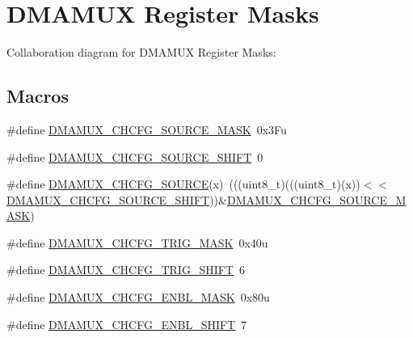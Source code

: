 \hypertarget{group___d_m_a_m_u_x___register___masks}{}\section{D\+M\+A\+M\+UX Register Masks}
\label{group___d_m_a_m_u_x___register___masks}
Collaboration diagram for D\+M\+A\+M\+UX Register Masks\+:
\subsection*{Macros}
\begin{DoxyCompactItemize}
\item 
\#define \hyperlink{group___d_m_a_m_u_x___register___masks_ga35b279ba0b1c9e817901494cdac305c5}{D\+M\+A\+M\+U\+X\+\_\+\+C\+H\+C\+F\+G\+\_\+\+S\+O\+U\+R\+C\+E\+\_\+\+M\+A\+SK}~0x3\+Fu
\item 
\#define \hyperlink{group___d_m_a_m_u_x___register___masks_gac2b7553c4599d8e919750598dd03f8a3}{D\+M\+A\+M\+U\+X\+\_\+\+C\+H\+C\+F\+G\+\_\+\+S\+O\+U\+R\+C\+E\+\_\+\+S\+H\+I\+FT}~0
\item 
\#define \hyperlink{group___d_m_a_m_u_x___register___masks_ga26ed125b670223f11ea326335729bb9b}{D\+M\+A\+M\+U\+X\+\_\+\+C\+H\+C\+F\+G\+\_\+\+S\+O\+U\+R\+CE}(x)~(((uint8\+\_\+t)(((uint8\+\_\+t)(x))$<$$<$\hyperlink{group___d_m_a_m_u_x___register___masks_gac2b7553c4599d8e919750598dd03f8a3}{D\+M\+A\+M\+U\+X\+\_\+\+C\+H\+C\+F\+G\+\_\+\+S\+O\+U\+R\+C\+E\+\_\+\+S\+H\+I\+FT}))\&\hyperlink{group___d_m_a_m_u_x___register___masks_ga35b279ba0b1c9e817901494cdac305c5}{D\+M\+A\+M\+U\+X\+\_\+\+C\+H\+C\+F\+G\+\_\+\+S\+O\+U\+R\+C\+E\+\_\+\+M\+A\+SK})
\item 
\#define \hyperlink{group___d_m_a_m_u_x___register___masks_gafd2b6158f86bedffb640e73c40cdd0f5}{D\+M\+A\+M\+U\+X\+\_\+\+C\+H\+C\+F\+G\+\_\+\+T\+R\+I\+G\+\_\+\+M\+A\+SK}~0x40u
\item 
\#define \hyperlink{group___d_m_a_m_u_x___register___masks_ga714a6b142fde49d701e3f624bb2417e1}{D\+M\+A\+M\+U\+X\+\_\+\+C\+H\+C\+F\+G\+\_\+\+T\+R\+I\+G\+\_\+\+S\+H\+I\+FT}~6
\item 
\#define \hyperlink{group___d_m_a_m_u_x___register___masks_ga311ccb0a9a00f29da44f8c41b33ba79f}{D\+M\+A\+M\+U\+X\+\_\+\+C\+H\+C\+F\+G\+\_\+\+E\+N\+B\+L\+\_\+\+M\+A\+SK}~0x80u
\item 
\#define \hyperlink{group___d_m_a_m_u_x___register___masks_ga23d6f41370761b5c68e4d49f419aaee9}{D\+M\+A\+M\+U\+X\+\_\+\+C\+H\+C\+F\+G\+\_\+\+E\+N\+B\+L\+\_\+\+S\+H\+I\+FT}~7
\end{DoxyCompactItemize}



